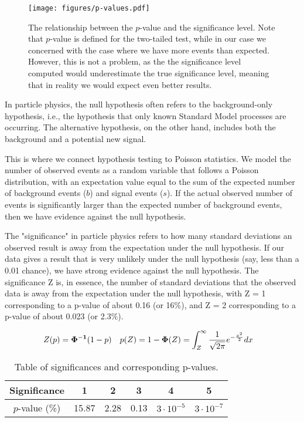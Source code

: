 \begin{figure}[htb]
    \centering
    \texttt{[image: figures/p-values.pdf]}
    \caption{The relationship between the $p$-value and the significance level. Note that $p$-value is defined for the
        two-tailed test, while in our case we concerned with the case where we have more events than expected. However,
        this is not a problem, as the the significance level computed would underestimate the true significance level,
        meaning that in reality we would expect even better results.}
    \label{fig:p-values}
\end{figure}

In particle physics, the null hypothesis often refers to the background-only hypothesis, i.e., the hypothesis that only
known Standard Model processes are occurring. The alternative hypothesis, on the other hand, includes both the
background and a potential new signal.

This is where we connect hypothesis testing to Poisson statistics. We model the number of observed events as a random
variable that follows a Poisson distribution, with an expectation value equal to the sum of the expected number of
background events ($b$) and signal events ($s$). If the actual observed number of events is significantly larger than the
expected number of background events, then we have evidence against the null hypothesis.

The "significance" in particle physics refers to how many standard deviations an observed result is away from the
expectation under the null hypothesis. If our data gives a result that is very unlikely under the null hypothesis (say,
less than a 0.01 chance), we have strong evidence against the null hypothesis. The significance Z is, in essence, the
number of standard deviations that the observed data is away from the expectation under the null hypothesis, with Z = 1
corresponding to a p-value of about 0.16 (or 16\%), and Z = 2 corresponding to a p-value of about 0.023 (or 2.3\%).

\begin{align}
    Z(p) & = \mathbf{\Phi^{-1}}(1 - p) & p(Z) & = 1 - \mathbf{\Phi}(Z) = \int_{Z}^{\infty} \frac{1}{\sqrt{2\pi}} e^{-\frac{x^2}{2}} dx
\end{align}

\begin{table}[htb]
    \centering
    \begin{tabular}{|c|c|c|c|c|c|}
        \hline
        Significance   & 1     & 2    & 3    & 4                 & 5                 \\
        \hline
        $p$-value (\%) & 15.87 & 2.28 & 0.13 & $3 \cdot 10^{-5}$ & $3 \cdot 10^{-7}$ \\
        \hline
    \end{tabular}
    \caption{Table of significances and corresponding p-values.}
    \label{tab:significance}
\end{table}

